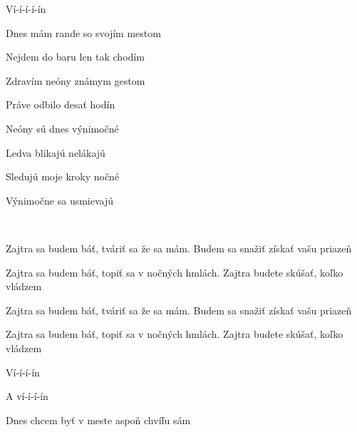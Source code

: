 \begin{song}
 \par
{}Ví-í-í-í-ín  \par
{}     \par

\bigskip

 \par
{} Dnes mám rande so svojím mestom \par
{} Nejdem do baru len tak chodím \par
{} Zdravím neóny známym gestom \par
{} Práve odbilo desať hodín \par

\bigskip

\Refren \par

\bigskip

 Neóny sú dnes výnimočné \par
{} Ledva blikajú nelákajú \par
{} Sledujú moje kroky nočné \par
{} Výnimočne sa usmievajú \par

\bigskip

\Refren\  \par

\bigskip

Zajtra sa budem báť, tváriť sa že sa mám. Budem sa snažiť získať vašu priazeň \par
{}Zajtra sa budem báť, topiť sa v nočných hmlách. Zajtra budete skúšať, koľko vládzem \par
{}Zajtra sa budem báť, tváriť sa že sa mám. Budem sa snažiť získať vašu priazeň \par
{}Zajtra sa budem báť, topiť sa v nočných hmlách. Zajtra budete skúšať, koľko vládzem \par

\bigskip

Ví-í-í-ín \par
A ví-í-í-ín \par

\bigskip

Dnes chcem byť v meste aspoň chvíľu sám \par




\end{song}
